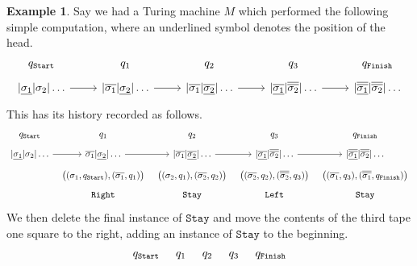 \documentclass[12pt]{article}
\theoremstyle{plain}
\theoremstyle{definition}
\newtheorem{example}[thm]{Example}
\begin{document}
\begin{example}
	Say we had a Turing machine $M$ which performed the following simple computation, where an underlined symbol denotes the position of the head.
	\begin{equation}\label{eq:example}
		\begin{tikzcd}[row sep = tiny]
			{q_{\texttt{Start}}} & {q_1} & {q_2} & q_3 & {q_{\texttt{Finish}}}\\
			{|\underline{\sigma_1}|\sigma_2|\ldots}\arrow[r] & {|\overline{\sigma_1}|\underline{\sigma_2}|\ldots}\arrow[r] & {|\overline{\sigma_1}|\underline{\overline{\sigma_2}}|\ldots}\arrow[r] & {|\underline{\overline{\sigma_1}}|\overline{\overline{\sigma_2}}|\ldots}\arrow[r] & {|\underline{\overline{\overline{\sigma_1}}}|\overline{\overline{\sigma_2}}|\ldots}
		\end{tikzcd}
	\end{equation}
	This has its history recorded as follows.
	\begin{equation*}
		\begin{tikzcd}[row sep = tiny, column sep = tiny]
			{q_{\texttt{Start}}} & {q_1} & {q_2} & q_3 & {q_{\texttt{Finish}}}\\
			{|\underline{\sigma_1}|\sigma_2|\ldots}\arrow[r] & {\overline{\sigma_1}|\underline{\sigma_2}|\ldots}\arrow[r] & {|\overline{\sigma_1}|\underline{\overline{\sigma_2}}|\ldots}\arrow[r] & {|\underline{\overline{\sigma_1}}|\overline{\overline{\sigma_2}}|\ldots}\arrow[r] & {|\underline{\overline{\overline{\sigma_1}}}|\overline{\overline{\sigma_2}}|\ldots}\\
			& {\big((\sigma_1, q_{\texttt{Start}}), (\overline{\sigma_1}, q_1)\big)} & {\big((\sigma_2, q_1), (\overline{\sigma_2}, q_2)\big)} & {\big((\overline{\sigma_2}, q_2), (\overline{\overline{\sigma_2}}, q_3)\big)} & {\big((\overline{\sigma_1}, q_3), (\overline{\overline{\sigma_1}}, q_{\texttt{Finish}})\big)}\\
			& \texttt{Right} & \texttt{Stay} & \texttt{Left} & \texttt{Stay}
		\end{tikzcd}
	\end{equation*}
	We then delete the final instance of $\texttt{Stay}$ and move the contents of the third tape one square to the right, adding an instance of $\texttt{Stay}$ to the beginning.
	\begin{equation*}
		\begin{tikzcd}[row sep = tiny, column sep = tiny]
			{q_{\texttt{Start}}} & {q_1} & {q_2} & q_3 & {q_{\texttt{Finish}}}\\

\end{tikzcd}
\end{equation*}
\end{example}
\end{document}
